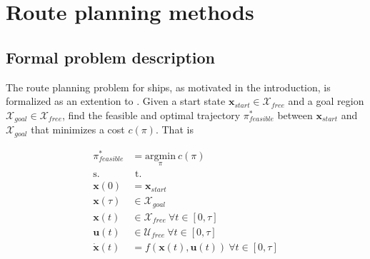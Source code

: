 
\chapter{Route planning methods}

\section{Formal problem description}

\iffalse
Differential or non-holonomic constraints can be described by a forward propagation function $f : \mathcal{X} \times \mathcal{U} \to \dot{\mathcal{X}} $, where $\mathcal{X}$ and $\mathcal{U}$ represent the state and control spaces, respectively \parencite{lee2017}.

By feasible it should consider
\begin{itemize}
  \item Non-holonomic or inequality constraints caused by avoiding collision with land.
  \item Differential constraints caused by the kinodynamic system.
\end{itemize}

Closed-loop planning.

Non-linear dynamics.

Single query.

Kinodynamic planning.


not holonomic robots, kinodynamic

\fi

The route planning problem for ships, as motivated in the introduction, is formalized as an extention to \parencite{webb2013}. Given a start state $\textbf{x}_{start} \in \mathcal{X}_{free}$ and a goal region $\mathcal{X}_{goal} \in \mathcal{X}_{free}$, find the feasible and optimal trajectory $\pi^*_{feasible}$ between $\textbf{x}_{start}$ and $\mathcal{X}_{goal}$ that minimizes a cost $c(\pi)$. That is

\begin{subequations}
\begin{align}
\pi^*_{feasible} &= \underset{\pi}{\text{argmin}} \ c(\pi) \\
\text{s.}& \text{ t.} \nonumber \\
\textbf{x}(0) &= \textbf{x}_{start} \\
\textbf{x}(\tau) &\in \mathcal{X}_{goal} \\
\textbf{x}(t) &\in \mathcal{X}_{free} \ \forall t \in [0,\tau] \\
\textbf{u}(t) &\in \mathcal{U}_{free} \ \forall t \in [0,\tau]  \\
\dot{\textbf{x}}(t) &= f(\textbf{x}(t), \textbf{u}(t)) \ \forall t \in [0,\tau] 
\end{align}
\end{subequations}






